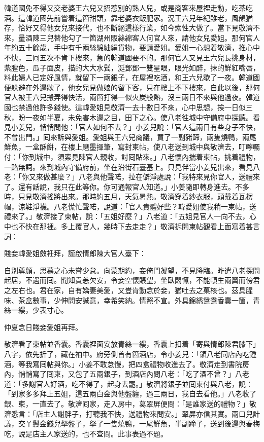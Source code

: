 韓道國免不得又交老婆王六兒又招惹別的熟人兒，{}或是商客來屋裡走動，吃茶吃酒。這韓道國先前嘗着這箇甜頭，靠老婆衣飯肥家。況王六兒年紀雖老，風韻猶存，恰好又得他女兒來接代，也不斷絕這樣行業，如今索性大做了。當下見敬濟不來，量酒陳三兒替他勾了一箇湖州販絲綿客人何官人來，請他女兒愛姐。那何官人年約五十餘歲，手中有千兩絲綿紬絹貨物，要請愛姐。愛姐一心想着敬濟，推心中不快，三囘五次不肯下樓來，急的韓道國要不的。那何官人又見王六兒長挑身材，紫膛色，瓜子面皮，描的大大水鬂，涎鄧鄧一雙星眼，眼光如醉，抹的鮮紅嘴唇，料此婦人已定好風情，{}就留下一兩銀子，在屋裡吃酒，和王六兒歇了一夜。韓道國便躲避在外邊歇了，他女兒見做娘的留下客，只在樓上不下樓來，自此以後，那何官人被王六兒搬弄得快活，兩箇打得一似火炭般熱，沒三兩日不來與他過夜。韓道國也禁過他許多錢使。{}這韓愛姐見敬濟一去十數日不來，心中思想，挨一日似三秋，盼一夜如半夏，未免害木邊之目，田下之心。使八老徃城中守備府中探聽。看見小姜兒，悄悄問他：「官人如何不去？」小姜兒說：「官人這兩日有些身子不快，不曾出門。」囘來訴與愛姐。愛姐與王六兒商議，買了一副豬蹄，兩隻燒鴨，兩尾鮮魚，一盒酥餅，在樓上磨墨揮筆，寫封柬帖，使八老送到城中與敬濟去，叮嚀囑付：「你到城中，須索見陳官人親收，討囘貼來。」八老懷內揣着柬帖，挑着禮物，一路無詞。來到城內守備府前，坐在沿街石臺基上。只見伴當小姜兒出來，看見八老：「你又來做甚麼？」八老與他聲喏，拉在僻淨處說：「我特來見你官人，送禮來了。還有話說，我只在此等你。你可通報官人知道。」小姜隨即轉身進去。不多時，只見敬濟搖將出來。那時約五月，天氣暑熱。敬濟穿着紗衣服，頭戴着瓦楞帽，涼鞋淨襪。八老慌忙聲喏，說道：「官人貴體好些？韓愛姐使我稍一柬帖，送禮來了。」敬濟接了柬帖，說：「五姐好麼？」八老道：「五姐見官人一向不去，心中也不快在那裡。多上覆官人，幾時下去走走？」敬濟拆開柬帖觀看上面寫着甚言詞：

賤妾韓愛姐斂衽拜，謹啟情郎陳大官人臺下：

自別尊顏，思慕之心未嘗少怠。向蒙期約，妾倚門凝望，不見降臨。昨遣八老探問起居，不遇而囘。聞知貴恙欠安，令妾空懷賬望，坐臥悶懨，不能頓生兩翼而傍君之左右也。君在家，自有嬌妻美愛，又豈肯動念於妾，猶吐去之菓核也。茲具腥味、茶盒數事，少伸問安誠意，幸希笑納。情照不宣。{}外具錦綉鴛鴦香囊一箇，青絲一縷，少表寸心。

仲夏念日賤妾愛姐再拜。

敬濟看了柬帖並香囊。香囊裡面安放青絲一縷，香囊上扣着「寄與情郎陳君膝下」八字，{}依先折了，藏在袖中。府旁側首有箇酒店，令小姜兒：「領八老同店內吃鍾酒，等我寫囘帖與你。」小姜不敢怠慢，把四盒禮物收進去了。敬濟走到書院房內，悄悄寫了囘柬，又包了五兩銀子，到酒店內問八老：「吃了酒不曾？」八老道：「多謝官人好酒，吃不得了，起身去罷。」敬濟將銀子並囘柬付與八老，說：「到家多多拜上五姐，這五兩白金與他盤纏，過三兩日，我自去看他。」八老收了銀、柬，一直去了。敬濟囘家，走入房中，葛翠屏便問：「是誰家送的禮物？」敬濟悉言：「店主人謝胖子，打聽我不快，送禮物來問安。」翠屏亦信其實。兩口兒計議，交丫鬟金錢兒拏盤子，拏了一隻燒鴨，一尾鮮魚，半副蹄子，送到後邊與春梅吃，說是店主人家送的，也不查問。此事表過不題。

